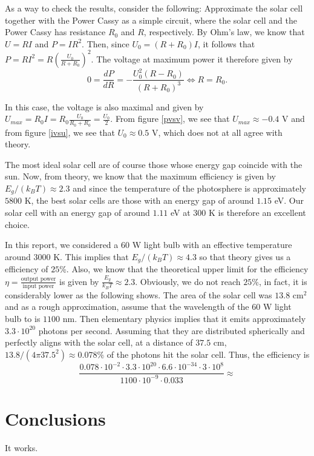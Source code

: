 \documentclass[a4paper]{article}
\begin{document}
As a way to check the results, consider the following: Approximate the solar cell together with the Power Cassy as a simple circuit, where the solar cell and the Power Cassy has resistance $R_0$ and $R$, respectively. 
By Ohm's law, we know that $U=RI$ and $P=IR^2$. Then, since $U_0=(R+R_0)I$, it follows that $P=RI^2=R\left( \frac{U_0}{R+R_0} \right)^2$.
The voltage at maximum power it therefore given by
\begin{displaymath}
  0=\frac{dP}{dR}=-\frac{U_0^2(R-R_0)}{(R+R_0)^3}\iff R=R_0.
\end{displaymath}

In this case, the voltage is also maximal and given by $U_{max}=R_0I=R_0\frac{U_0}{R_0+R_0}=\frac{U_0}{2}$.
From figure \ref{pvsv}, we see that $U_{max}\approx -0.4$ V and from figure \ref{ivsu}, we see that $U_0\approx 0.5$ V, which does not at all agree with theory.

The most ideal solar cell are of course those whose energy gap coincide with the sun. Now, from theory, we know that the maximum efficiency is given by $E_g/(k_BT)\approx 2.3$ and since the temperature of the photosphere is approximately $5800$ K, the best solar cells are those with an energy gap of around $1.15$ eV.
Our solar cell with an energy gap of around $1.11$ eV at $300$ K is therefore an excellent choice.

In this report, we considered a $60$ W light bulb with an effective temperature around $3000$ K. This implies that $E_g/(k_B T)\approx 4.3$ so that theory gives us a efficiency of $25$\%.
Also, we know that the theoretical upper limit for the efficiency $\eta=\frac{\text{output power}}{\text{input power}}$ is given by $\frac{E_g}{k_B T}\approx 2.3$.
Obviously, we do not reach $25$\%, in fact, it is considerably lower as the following shows.
The area of the solar cell was $13.8$ cm${}^2$ and as a rough approximation, assume that the wavelength of the $60$ W light bulb to is $1100$ nm. Then elementary physics implies that it emits approximately $3.3\cdot 10^{20}$ photons per second. Assuming that they are distributed spherically and perfectly aligns with the solar cell, at a distance of $37.5$ cm, $13.8/(4\pi 37.5^2)\approx 0.078 \%$ of the photons hit the solar cell.
Thus, the efficiency is 
\begin{displaymath}
\frac{0.078\cdot 10^{-2}\cdot 3.3\cdot 10^{20}\cdot 6.6\cdot 10^{-34}\cdot 3\cdot 10^8}{1100\cdot 10^{-9}\cdot 0.033 }\approx
\end{displaymath}

\section{Conclusions}

It works.
\end{document}
